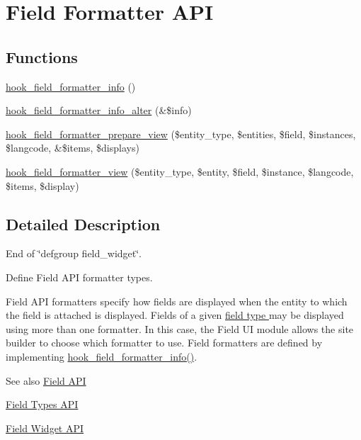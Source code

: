 \hypertarget{group__field__formatter}{
\section{Field Formatter API}
\label{group__field__formatter}
}
\subsection*{Functions}
\begin{DoxyCompactItemize}
\item 
\hyperlink{group__field__formatter_ga2f5aa1c7455f55dffd84a48efa57f987}{hook\_\-field\_\-formatter\_\-info} ()
\item 
\hyperlink{group__field__formatter_ga42c57fcac0e7a09f757983224136a850}{hook\_\-field\_\-formatter\_\-info\_\-alter} (\&\$info)
\item 
\hyperlink{group__field__formatter_ga2c1856869caa776fd9e5db4af4e0b57b}{hook\_\-field\_\-formatter\_\-prepare\_\-view} (\$entity\_\-type, \$entities, \$field, \$instances, \$langcode, \&\$items, \$displays)
\item 
\hyperlink{group__field__formatter_gaa588d99481fa147a1c88416e55fdfad6}{hook\_\-field\_\-formatter\_\-view} (\$entity\_\-type, \$entity, \$field, \$instance, \$langcode, \$items, \$display)
\end{DoxyCompactItemize}


\subsection{Detailed Description}
End of \char`\"{}defgroup field\_\-widget\char`\"{}.

Define Field API formatter types.

Field API formatters specify how fields are displayed when the entity to which the field is attached is displayed. Fields of a given \hyperlink{group__field__types}{field type } may be displayed using more than one formatter. In this case, the Field UI module allows the site builder to choose which formatter to use. Field formatters are defined by implementing \hyperlink{group__field__formatter_ga2f5aa1c7455f55dffd84a48efa57f987}{hook\_\-field\_\-formatter\_\-info()}.

\begin{DoxySeeAlso}{See also}
\hyperlink{group__field}{Field API} 

\hyperlink{group__field__types}{Field Types API} 

\hyperlink{group__field__widget}{Field Widget API} 
\end{DoxySeeAlso}


